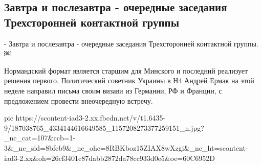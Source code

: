  
 
 
 
 
\subsection{Завтра и послезавтра - очередные заседания Трехсторонней контактной группы}

- Завтра и послезавтра - очередные заседания Трехсторонней контактной группы.￼

Нормандский формат является старшим для Минского и последний реализует решения первого. 
Политический советник Украины в Н4 Андрей Ермак на этой неделе направил письма своим визави из Германии, РФ и Франции, с предложением провести внеочередную встречу.

\ifcmt
  pic https://scontent-iad3-2.xx.fbcdn.net/v/t1.6435-9/187038765_4334144616649585_1157208273377259151_n.jpg?_nc_cat=107&ccb=1-3&_nc_sid=8bfeb9&_nc_ohc=8RBKboz15ZIAX8wXzgi&_nc_ht=scontent-iad3-2.xx&oh=26cf3401c87dabb2872da78cc933d0e5&oe=60C6952D
\fi

